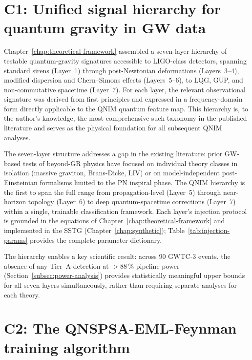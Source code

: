 \documentclass[11pt,a4paper, english]{book}
\theoremstyle{plain}
\theoremstyle{definition}
\numberwithin{equation}{chapter}
\numberwithin{figure}{chapter}
\numberwithin{table}{chapter}
\begin{document}
\section{C1: Unified signal hierarchy for quantum gravity in GW data}
\label{app:contrib1}

Chapter~\ref{chap:theoretical-framework} assembled a seven-layer hierarchy
of testable quantum-gravity signatures accessible to LIGO-class detectors,
spanning standard sirens (Layer~1) through post-Newtonian deformations
(Layers~3--4), modified dispersion and Chern--Simons effects (Layers~5--6),
to LQG, GUP, and non-commutative spacetime (Layer~7).
For each layer, the relevant observational signature was derived from first
principles and expressed in a frequency-domain form directly applicable to
the QNIM quantum feature map.
This hierarchy is, to the author's knowledge, the most comprehensive
such taxonomy in the published literature and serves as the physical
foundation for all subsequent QNIM analyses.

The seven-layer structure addresses a gap in the existing literature: prior
GW-based tests of beyond-GR physics have focused on individual theory classes
in isolation (massive graviton, Brans-Dicke, LIV) or on model-independent
post-Einsteinian formalisms limited to the PN inspiral phase.  The QNIM
hierarchy is the first to span the full range from propagation-level
(Layer~5) through near-horizon topology (Layer~6) to deep quantum-spacetime
corrections (Layer~7) within a single, trainable classification framework.
Each layer's injection protocol is grounded in the equations of
Chapter~\ref{chap:theoretical-framework} and implemented in the SSTG
(Chapter~\ref{chap:synthetic}); Table~\ref{tab:injection-params} provides the
complete parameter dictionary.

The hierarchy enables a key scientific result: across 90 GWTC-3 events, the
absence of any Tier~A detection at $>88\,\%$ pipeline power
(Section~\ref{subsec:power-analysis}) provides statistically meaningful upper
bounds for all seven layers simultaneously, rather than requiring separate
analyses for each theory.

\section{C2: The QNSPSA-EML-Feynman training algorithm}
\label{app:contrib2}
\end{document}
